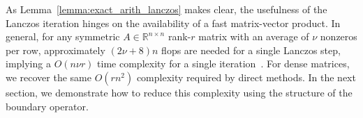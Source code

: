 \documentclass[10pt]{article}
\numberwithin{equation}{section}
\newcommand{\+}{%
	\raisebox{0.18ex}{\scaleobj{0.55}{+}}
}
\theoremstyle{definition}
\begin{document}
As Lemma~\ref{lemma:exact_arith_lanczos} makes clear, the usefulness of the Lanczos iteration hinges on the availability of a fast matrix-vector product. 
In general, for any symmetric $A \in \mathbb{R}^{n \times n}$ rank-$r$ matrix with an average of $\nu$ nonzeros per row, approximately $(2\nu + 8)n$ flops are needed for a single Lanczos step, implying a $O(n\nu r)$ time complexity for a single iteration~\cite{golub2013matrix}. For dense matrices, we recover the same $O(r n^2)$ complexity required by direct methods. 
In the next section, we demonstrate how to reduce this complexity using the structure of the boundary operator. 

\end{document}
